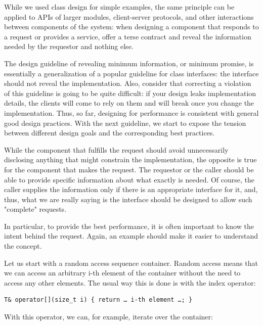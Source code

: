 While we used class design for simple examples, the same principle can be applied to APIs of larger modules, client-server protocols, and other interactions between components of the system: when designing a component that responds to a request or provides a service, offer a terse contract and reveal the information needed by the requestor and nothing else.

The design guideline of revealing minimum information, or minimum promise, is essentially a generalization of a popular guideline for class interfaces: the interface should not reveal the implementation. Also, consider that correcting a violation of this guideline is going to be quite difficult: if your design leaks implementation details, the clients will come to rely on them and will break once you change the implementation. Thus, so far, designing for performance is consistent with general good design practices. With the next guideline, we start to expose the tension between different design goals and the corresponding best practices.




While the component that fulfills the request should avoid unnecessarily disclosing anything that might constrain the implementation, the opposite is true for the component that makes the request. The requestor or the caller should be able to provide specific information about what exactly is needed. Of course, the caller supplies the information only if there is an appropriate interface for it, and, thus, what we are really saying is the interface should be designed to allow such "complete" requests.

In particular, to provide the best performance, it is often important to know the intent behind the request. Again, an example should make it easier to understand the concept.
 
Let us start with a random access sequence container. Random access means that we can access an arbitrary i-th element of the container without the need to access any other elements. The usual way this is done is with the index operator:

\begin{lstlisting}[style=styleCXX]
T& operator[](size_t i) { return … i-th element …; }
\end{lstlisting}

With this operator, we can, for example, iterate over the container:

